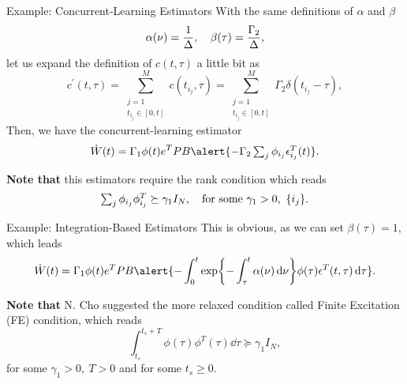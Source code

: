 \documentclass[]{beamer}
\theoremstyle{plain}
\theoremstyle{definition}
\theoremstyle{remark}
\begin{document}
\begin{frame}{Example: Concurrent-Learning Estimators}
	With the same definitions of $\alpha$ and $\beta$
	\begin{equation*}
		\alpha(\nu) = \frac{1}{\Delta} \qc \beta(\tau) = \frac{\Gamma_2}{\Delta},
	\end{equation*}
	let us expand the definition of $c(t, \tau)$ a little bit as
	\begin{equation*}
		c^\prime(t, \tau) = \sum_{\substack{j=1 \\ t_{i_j} \in [0, t]}}^{M}
		c(t_{i_j}, \tau) = \sum_{\substack{j=1 \\ t_{i_j} \in [0, t]}}^{M}
		\Gamma_2 \delta(t_{i_j} - \tau),
	\end{equation*}
	Then, we have the concurrent-learning estimator
	\begin{equation*}
		\dot{W}(t) = \Gamma_1 \phi(t) e^T P B \alert{- \Gamma_2
		\textstyle\sum_j \phi_{i_j} \epsilon_{i_j}^T(t)}.
	\end{equation*}
	\pause

	\textbf{Note that} this estimators require the \alert{rank condition} which
	reads
	\begin{equation*}
		\textstyle\sum_j \phi_{i_j} \phi^T_{i_j} \succeq \gamma_1 I_N \qc \text{for
		some } \gamma_1 > 0,\ \{i_j\}.
	\end{equation*}
\end{frame}

\begin{frame}{Example: Integration-Based Estimators}
	This is obvious, as we can set $\beta(\tau) = 1$, which leads
	\begin{equation*}
		\dot{W}(t) = \Gamma_1 \phi(t) e^T P B \alert{- \int_0^t
			\exp{- \int_\tau^t \alpha(\nu) \dd{\nu}} \phi(\tau) \epsilon^T(t,
		\tau) \dd{\tau}}.
	\end{equation*}

	\textbf{Note that} N. Cho suggested the more relaxed condition called
	\alert{Finite Excitation (FE)} condition, which reads
	\begin{equation*}
		\int_{t_s}^{t_s + T} \phi(\tau) \phi^T(\tau) \dd{\tau} \succeq \gamma_1
		I_N,
	\end{equation*}
	for some $\gamma_1 > 0,\ T > 0$ and for \alert{some} $t_s \ge 0$.
\end{frame}
\end{document}
